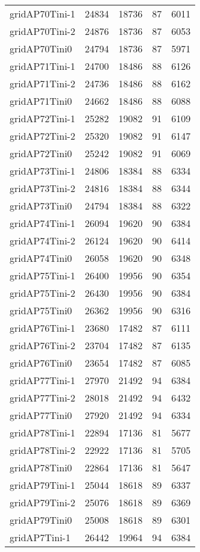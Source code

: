 \begin{tabular}{lrrrr}
gridAP70Tini-1 & 24834 & 18736 & 87 & 6011 \\
gridAP70Tini-2 & 24876 & 18736 & 87 & 6053 \\
gridAP70Tini0 & 24794 & 18736 & 87 & 5971 \\
gridAP71Tini-1 & 24700 & 18486 & 88 & 6126 \\
gridAP71Tini-2 & 24736 & 18486 & 88 & 6162 \\
gridAP71Tini0 & 24662 & 18486 & 88 & 6088 \\
gridAP72Tini-1 & 25282 & 19082 & 91 & 6109 \\
gridAP72Tini-2 & 25320 & 19082 & 91 & 6147 \\
gridAP72Tini0 & 25242 & 19082 & 91 & 6069 \\
gridAP73Tini-1 & 24806 & 18384 & 88 & 6334 \\
gridAP73Tini-2 & 24816 & 18384 & 88 & 6344 \\
gridAP73Tini0 & 24794 & 18384 & 88 & 6322 \\
gridAP74Tini-1 & 26094 & 19620 & 90 & 6384 \\
gridAP74Tini-2 & 26124 & 19620 & 90 & 6414 \\
gridAP74Tini0 & 26058 & 19620 & 90 & 6348 \\
gridAP75Tini-1 & 26400 & 19956 & 90 & 6354 \\
gridAP75Tini-2 & 26430 & 19956 & 90 & 6384 \\
gridAP75Tini0 & 26362 & 19956 & 90 & 6316 \\
gridAP76Tini-1 & 23680 & 17482 & 87 & 6111 \\
gridAP76Tini-2 & 23704 & 17482 & 87 & 6135 \\
gridAP76Tini0 & 23654 & 17482 & 87 & 6085 \\
gridAP77Tini-1 & 27970 & 21492 & 94 & 6384 \\
gridAP77Tini-2 & 28018 & 21492 & 94 & 6432 \\
gridAP77Tini0 & 27920 & 21492 & 94 & 6334 \\
gridAP78Tini-1 & 22894 & 17136 & 81 & 5677 \\
gridAP78Tini-2 & 22922 & 17136 & 81 & 5705 \\
gridAP78Tini0 & 22864 & 17136 & 81 & 5647 \\
gridAP79Tini-1 & 25044 & 18618 & 89 & 6337 \\
gridAP79Tini-2 & 25076 & 18618 & 89 & 6369 \\
gridAP79Tini0 & 25008 & 18618 & 89 & 6301 \\
gridAP7Tini-1 & 26442 & 19964 & 94 & 6384 \\

\end{tabular}
